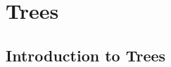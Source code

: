 \documentclass[../discrete.tex]{subfiles}
\begin{document}
\chapter{Trees}
\section{Introduction to Trees}
\end{document}
